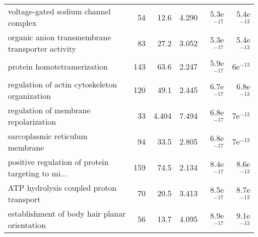 \begin{longtable}{lrrrrr}
              voltage-gated sodium channel complex &                      54 &                    12.6 &      4.290 &         5.3e$^{-17}$ &         5.4e$^{-13}$ \\
  organic anion transmembrane transporter activity &                      83 &                    27.2 &      3.052 &         5.3e$^{-17}$ &         5.4e$^{-13}$ \\
                       protein homotetramerization &                     143 &                    63.6 &      2.247 &         5.9e$^{-17}$ &           6e$^{-13}$ \\
     regulation of actin cytoskeleton organization &                     120 &                    49.1 &      2.445 &         6.7e$^{-17}$ &         6.8e$^{-13}$ \\
             regulation of membrane repolarization &                      33 &                   4.404 &      7.494 &         6.8e$^{-17}$ &           7e$^{-13}$ \\
                   sarcoplasmic reticulum membrane &                      94 &                    33.5 &      2.805 &         6.8e$^{-17}$ &           7e$^{-13}$ \\
 positive regulation of protein targeting to mi... &                     159 &                    74.5 &      2.134 &         8.4e$^{-17}$ &         8.6e$^{-13}$ \\
           ATP hydrolysis coupled proton transport &                      70 &                    20.5 &      3.413 &         8.5e$^{-17}$ &         8.7e$^{-13}$ \\
     establishment of body hair planar orientation &                      56 &                    13.7 &      4.095 &         8.9e$^{-17}$ &         9.1e$^{-13}$ \\
\end{longtable}
